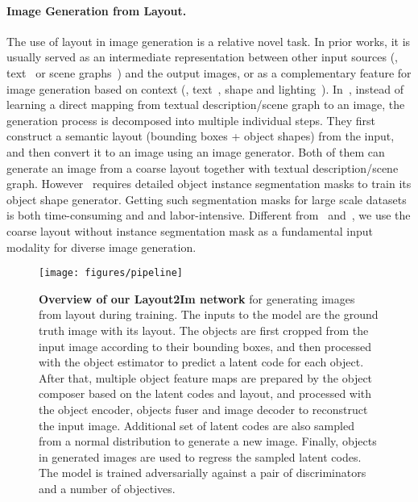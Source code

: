 \documentclass[10pt,twocolumn,letterpaper]{article}
\begin{document}
\paragraph{Image Generation from Layout.} 
The use of layout in image generation is a relative novel task. 
In prior works, it is usually served as an intermediate representation between other input sources (\eg, text~\cite{hong2018inferring} or scene graphs~\cite{Johnson2018}) and the output images, or as a complementary feature for image generation based on context (\eg, text~\cite{karacan2016learning, reed2016learning, tan2018text2scene}, shape and lighting~\cite{dosovitskiy2015learning}). 
In~\cite{hong2018inferring,Johnson2018}, instead of learning a direct mapping from textual description/scene graph to an image, the generation process is decomposed into multiple individual steps. They first construct a semantic layout (bounding boxes + object shapes) from the input, and then convert it to an image using an image generator. 
Both of them can generate an image from a coarse layout together with textual description/scene graph. However~\cite{hong2018inferring} requires detailed object instance segmentation masks to train its object shape generator. Getting such segmentation masks for large scale datasets is both time-consuming and and labor-intensive.
Different from~\cite{hong2018inferring} and~\cite{Johnson2018}, we use the coarse layout without instance segmentation mask as a fundamental input modality for diverse image generation.


\begin{figure*}[!ht]
  \centering
  \texttt{[image: figures/pipeline]}
  \caption{{\bf Overview of our Layout2Im network} for generating images from layout during training. The inputs to the model are the ground truth image with its layout. The objects are first cropped from the input image according to their bounding boxes, and then processed with the object estimator to predict a latent code for each object. After that, multiple object feature maps are prepared by the object composer based on the latent codes and layout, and processed with the object encoder, objects fuser and image decoder to reconstruct the input image. Additional set of latent codes are also sampled from a normal distribution to generate a new image. Finally, objects in generated images are used to regress the sampled latent codes. The model is trained adversarially against a pair of discriminators and a number of objectives.}
  \vspace{-0.2in}
  \label{fig:pipeline}
\end{figure*}
\end{document}

